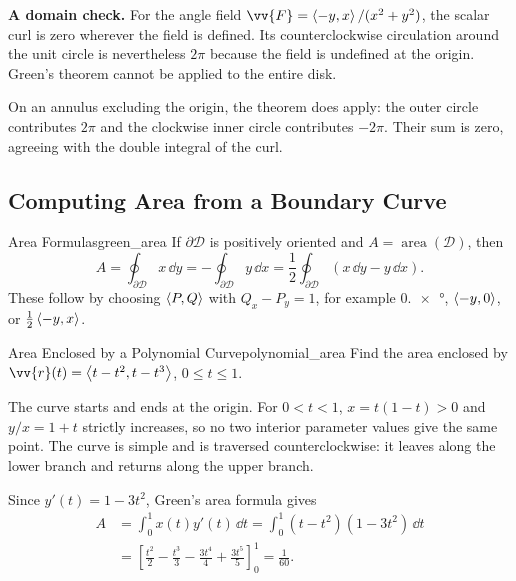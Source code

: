 \textbf{A domain check.}
For the angle field
$\vv{F} = \ang{-y,x}/(x^2 + y^2)$, the scalar curl is zero wherever the field is defined. Its counterclockwise circulation around the unit circle is nevertheless $2\pi$ because the field is undefined at the origin. Green's theorem cannot be applied to the entire disk.

On an annulus excluding the origin, the theorem does apply: the outer circle contributes $2\pi$ and the clockwise inner circle contributes $-2\pi$. Their sum is zero, agreeing with the double integral of the curl.

\newpage
\subsection{Computing Area from a Boundary Curve}

\begin{theorem}{Area Formulas}{green_area}
If $\partial\mathcal{D}$ is positively oriented and $A = \operatorname{area}(\mathcal{D})$, then
\[
    \boxed{A = \oint_{\partial\mathcal{D}}x\,\dd{y}
    = -\oint_{\partial\mathcal{D}}y\,\dd{x}
    = \frac12\oint_{\partial\mathcal{D}}(x\,\dd{y} - y\,\dd{x}).}
\]
These follow by choosing $\left\langle P,Q \right\rangle$ with $Q_x - P_y = 1$, for example
$\ang{0,x}$, $\left\langle -y,0 \right\rangle$, or $\frac12\left\langle -y,x \right\rangle$.
\end{theorem}

\begin{problem}{Area Enclosed by a Polynomial Curve}{polynomial_area}
Find the area enclosed by $\vv{r}(t) = \ang{t - t^2,t - t^3}$, $0 \le t \le 1$.
\end{problem}
\begin{sol}
The curve starts and ends at the origin. For $0 < t < 1$,
$x = t(1 - t) > 0$ and $y/x = 1 + t$ strictly increases, so no two interior parameter values give the same point. The curve is simple and is traversed counterclockwise: it leaves along the lower branch and returns along the upper branch.

Since $y'(t) = 1 - 3t^2$, Green's area formula gives
\begin{align*}
    A &= \int_0^1 x(t)y'(t)\,\dd{t}
       = \int_0^1(t - t^2)(1 - 3t^2)\,\dd{t}\\
      &= \left[\frac{t^2}{2} - \frac{t^3}{3} - \frac{3t^4}{4} + \frac{3t^5}{5}\right]_0^1
       = \boxed{\frac{1}{60}}.
\end{align*}
\end{sol}


